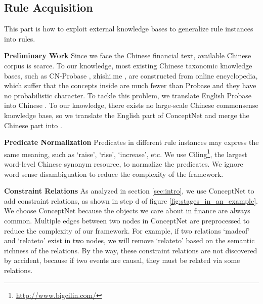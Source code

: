 \subsection{Rule Acquisition}
This part is how to exploit external knowledge bases to generalize rule instances into rules.

\textbf{Preliminary Work}
Since we face the Chinese financial text, available Chinese corpus is scarce.
To our knowledge, most existing Chinese taxonomic knowledge bases, such as CN-Probase \cite{Xu2017}, zhishi.me \cite{Niu2011}, are constructed from online encyclopedia, which suffer that the concepts inside are much fewer than Probase and they have no probabilistic character. To tackle this problem, we translate English Probase into Chinese \zhpro.
To our knowledge, there exists no large-scale Chinese commonsense knowledge base, so we translate the English part of ConceptNet and merge the Chinese part into \zhcon.

\textbf{Predicate Normalization}
Predicates in different rule instances may express the same meaning, such as `raise', `rise', `increase', etc. We use Ciling\footnote{ \url{ http://www.bigcilin.com/}}, the largest word-level Chinese synonym resource, to normalize the predicates. We ignore word sense disambiguation to reduce the complexity of the framework.


\textbf{Constraint Relations}
As analyzed in section \ref{sec:intro}, we use ConceptNet to add constraint relations, as shown in step d of figure \ref{fig:stages_in_an_example}. We choose ConceptNet because the objects we care about in finance are always common. Multiple edges between two nodes in ConceptNet are preprocessed to reduce the complexity of our framework.
For example, if two relations `madeof' and `relateto' exist in two nodes, we will remove `relateto' based on the semantic richness of the relations. 
By the way, these constraint relations are not discovered by accident, because if two events are causal, they must be related via some relations.
	
